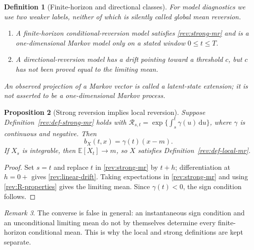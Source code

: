 \documentclass[11pt]{article}
\newtheorem{definition}{Definition}[section]
\newtheorem{proposition}[definition]{Proposition}
\theoremstyle{remark}
\newtheorem{remark}[definition]{Remark}
\newcommand{\E}{\mathbb E}
\newcommand{\dd}{\,\mathrm d}
\begin{document}
\begin{definition}[Finite-horizon and directional classes]
\label{rev:def-auxiliary-classes}
For model diagnostics we use two weaker labels, neither of which is silently
called global mean reversion.
\begin{enumerate}[label=(\roman*)]
\item A \emph{finite-horizon conditional-reversion model} satisfies
\eqref{rev:strong-mr} and is a one-dimensional Markov model only on a stated
window $0\le t\le T$.
\item A \emph{directional-reversion model} has a drift pointing toward a
threshold $c$, but $c$ has not been proved equal to the limiting mean.
\end{enumerate}
An observed projection of a Markov vector is called a \emph{latent-state
extension}; it is not asserted to be a one-dimensional Markov process.
\end{definition}

\begin{proposition}[Strong reversion implies local reversion]
\label{rev:prop-strong-local}
Suppose Definition~\ref{rev:def-strong-mr} holds with
$\mathcal R_{s,t}=\exp\{\int_s^t\gamma(u)\dd u\}$, where $\gamma$ is continuous and
negative.  Then
\begin{equation}
b_X(t,x)=\gamma(t)(x-m).
\label{rev:linear-drift}
\end{equation}
If $X_s$ is integrable, then $\E[X_t]\to m$, so $X$ satisfies
Definition~\ref{rev:def-local-mr}.
\end{proposition}

\begin{proof}
Set $s=t$ and replace $t$ in \eqref{rev:strong-mr} by $t+h$; differentiation
at $h=0+$ gives \eqref{rev:linear-drift}.  Taking expectations in
\eqref{rev:strong-mr} and using \eqref{rev:R-properties} gives the limiting
mean.  Since $\gamma(t)<0$, the sign condition follows.
\end{proof}

\begin{remark}
The converse is false in general: an instantaneous sign condition and an
unconditional limiting mean do not by themselves determine every finite-horizon
conditional mean.  This is why the local and strong definitions are kept
separate.
\end{remark}
\end{document}
